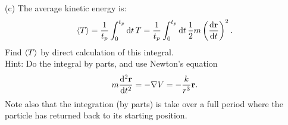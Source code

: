 \documentclass{article}
\begin{document}
        (c) The average kinetic energy is:
        \begin{equation*}
            \expval{T} = \frac{1}{t_p} \int_0^{t_p} \dd t\, T = \frac{1}{t_p} \int_0^{t_p} \dd t \, \frac{1}{2} m \left(\dv{\mathbf{r}}{t}\right)^2.
        \end{equation*}
        Find $\expval{T}$ by direct calculation of this integral. \\
        Hint: Do the integral by parts, and use Newton's equation
        \begin{equation*}
            m \dv[2]{\mathbf{r}}{t} = - \nabla V = - \frac{k}{r^3} \mathbf{r}.
        \end{equation*}
        Note also that the integration (by parts) is take over a full period where the particle has returned back to its starting position.
\end{document}
